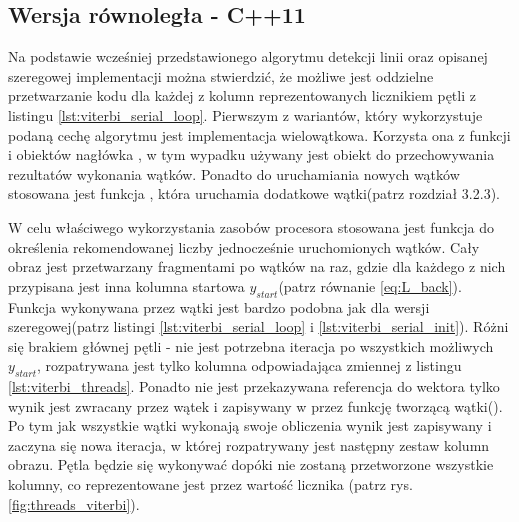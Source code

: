 \documentclass[document.tex]{subfiles}
\begin{document}
\subsection{Wersja równoległa - C++11}
\indent Na podstawie wcześniej przedstawionego algorytmu detekcji linii oraz opisanej szeregowej implementacji można stwierdzić, że możliwe jest oddzielne przetwarzanie kodu dla każdej z kolumn reprezentowanych licznikiem
 pętli z listingu \ref{lst:viterbi_serial_loop}. Pierwszym z wariantów, który wykorzystuje 
podaną cechę algorytmu jest implementacja wielowątkowa. Korzysta ona z funkcji i obiektów nagłówka , w tym wypadku używany jest obiekt  do przechowywania rezultatów wykonania
wątków. Ponadto do uruchamiania nowych wątków stosowana jest funkcja , która uruchamia dodatkowe wątki(patrz rozdział 3.2.3).
 

\indent W celu właściwego wykorzystania zasobów procesora stosowana jest funkcja  do określenia rekomendowanej liczby jednocześnie uruchomionych wątków.
Cały obraz jest przetwarzany fragmentami po  wątków na raz, gdzie dla każdego z nich przypisana jest inna kolumna startowa $y_{start}$(patrz równanie \ref{eq:L_back}). 
Funkcja wykonywana przez wątki jest bardzo podobna jak dla wersji szeregowej(patrz listingi \ref{lst:viterbi_serial_loop} i \ref{lst:viterbi_serial_init}). Różni się brakiem głównej pętli - nie jest potrzebna iteracja po wszystkich możliwych $y_{start}$, rozpatrywana jest tylko kolumna odpowiadająca zmiennej  z listingu \ref{lst:viterbi_threads}. Ponadto nie jest przekazywana referencja do wektora  tylko wynik jest zwracany przez wątek i zapisywany w  przez funkcję tworzącą wątki(). 
\clearpage
\indent Po tym jak wszystkie wątki wykonają swoje obliczenia wynik jest zapisywany i zaczyna się nowa iteracja, w której rozpatrywany jest następny zestaw kolumn obrazu. Pętla będzie się wykonywać dopóki nie zostaną przetworzone wszystkie kolumny, co reprezentowane jest przez wartość licznika (patrz rys.\ref{fig:threads_viterbi}).
\end{document}
